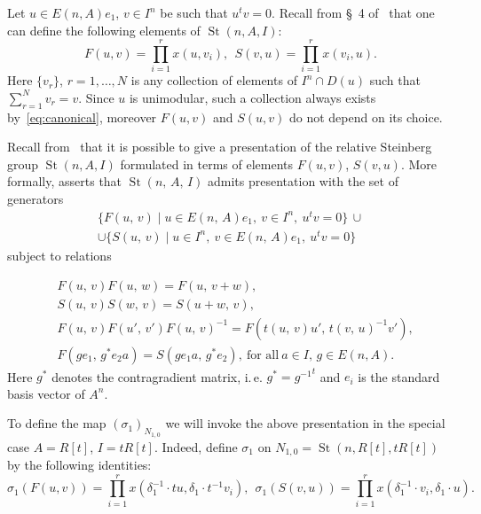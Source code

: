 \documentclass[oneside, 10pt]{amsart}
\DeclareMathOperator{\St}{St}
\numberwithin{equation}{section}
\numberwithin{lemma}{section}
\theoremstyle{definition}
\theoremstyle{remark}
\begin{document}
Let $u \in E(n, A)e_1$, $v \in I^n$ be such that $u^tv = 0$.
Recall from \S~4 of~\cite{LS17} that one can define the following elements of $\St(n, A, I)$:
\begin{equation} \label{eq:sigma-definition}
 F(u, v) = \prod\limits_{i=1}^r x(u,  v_i),\ \
 S(v, u) = \prod\limits_{i=1}^r x( v_i, u).
\end{equation}
Here $\{v_r\}$, $r=1,\ldots,N$ is any collection of elements of $I^n \cap D(u)$ such that $\sum_{r=1}^N v_r = v$.
Since $u$ is unimodular, such a collection always exists by~\eqref{eq:canonical}, moreover
 $F(u, v)$ and $S(u, v)$ do not depend on its choice. %

Recall from~\cite{LS17} that it is possible to give a presentation of the relative Steinberg group $\St(n, A, I)$ formulated in terms of elements $F(u, v)$, $S(v, u)$.
More formally, \cite[Proposition 3.10]{LS17} asserts that $\St(n,\,A,\,I)$ admits presentation with the set of generators
\begin{multline*} \{F(u,\,v)\mid u\in E(n,\,A)e_1,\ v\in I^n,\ u^tv=0\}\, \cup \\ \cup \{S(u,\,v)\mid u\in I^n,\ v\in E(n,\,A)e_1,\ u^tv=0\}\end{multline*}
subject to relations
\setcounter{equation}{0}
\renewcommand{\theequation}{R\arabic{equation}}

\begin{align}
&F(u,\,v)F(u,\,w)=F(u,\,v+w), \label{add4}\\
&S(u,\,v)S(w,\,v)=S(u+w,\,v), \label{add5}\\
&F(u,\,v)F(u',\,v')F(u,\,v)^{-1}=F(t(u,\,v)u',\,t(v,\,u)^{-1} v'), \label{conj3} \\
&F(ge_1,\,g^*e_2a)=S(ge_1a,\,g^*e_2),\ \text{for all}\ a\in I,\, g \in E(n, A).
\end{align}
Here $g^*$ denotes the contragradient matrix, i.\,e. $g^* = {g^{-1}}^t$ and $e_i$ is the standard basis vector of $A^n$.

\setcounter{equation}{3}
\renewcommand{\theequation}{\arabic{equation}}

To define the map $(\sigma_1)_{N_{1,0}}$ we will invoke the above presentation in the special case $A=R[t]$, $I=tR[t]$.
Indeed, define $\sigma_1$ on $N_{1,0}=\St(n, R[t], tR[t])$ by the following identities: 
\begin{equation}
 \sigma_1(F(u, v)) = \prod\limits_{i=1}^r x(\delta_1^{-1} \cdot t u, \delta_1 \cdot t^{-1} v_i),\ \
 \sigma_1(S(v, u)) = \prod\limits_{i=1}^r x(\delta_1^{-1} \cdot v_i, \delta_1 \cdot u).
\end{equation}
\end{document}
